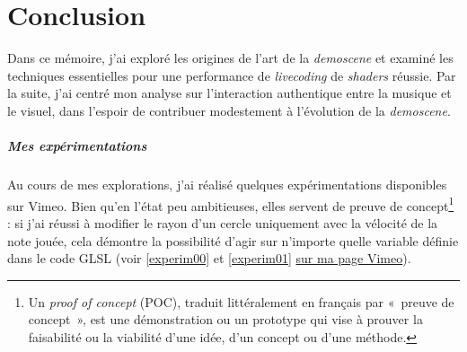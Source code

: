 \chapter{Conclusion}
Dans ce mémoire, j'ai exploré les origines de l'art de la \textit{demoscene} et examiné les techniques essentielles pour une performance de \textit{livecoding} de \textit{shaders} réussie. Par la suite, j'ai centré mon analyse sur l'interaction authentique entre la musique et le visuel, dans l'espoir de contribuer modestement à l'évolution de la \textit{demoscene}.

\paragraph*{Mes expérimentations}
Au cours de mes explorations, j'ai réalisé quelques expérimentations disponibles sur Vimeo. Bien qu'en l'état peu ambitieuses, elles servent de preuve de concept\footnote{Un \textit{proof of concept} (POC), traduit littéralement en français par «~preuve de concept~», est une démonstration ou un prototype qui vise à prouver la faisabilité ou la viabilité d'une idée, d'un concept ou d'une méthode.} : si j'ai réussi à modifier le rayon d'un cercle uniquement avec la vélocité de la note jouée, cela démontre la possibilité d'agir sur n'importe quelle variable définie dans le code GLSL (voir \ref{experim00} et \ref{experim01} \href{https://vimeo.com/user167850166}{sur ma page Vimeo}). 

